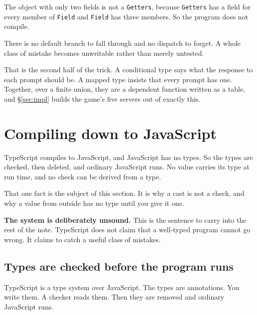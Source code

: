 \documentclass[11pt,a4paper]{article}
\begin{document}
\begin{pinkbox}
The object with only two fields is not a \texttt{Getters}, because \texttt{Getters} has a field for
every member of \texttt{Field} and \texttt{Field} has three members. So the program does not
compile.

There is no default branch to fall through and no dispatch to forget. A whole class of mistake
becomes unwritable rather than merely untested.

That is the second half of the trick. A conditional type says what the response to each prompt should
be. A mapped type insists that every prompt has one. Together, over a finite union, they are a
dependent function written as a table, and §\ref{sec:impl} builds the game's five servers out of
exactly this.
\end{pinkbox}

\newpage

\section{Compiling down to JavaScript}
\label{sec:unusual}

TypeScript compiles to JavaScript, and JavaScript has no types. So the types are checked, then
deleted, and ordinary JavaScript runs. No value carries its type at run time, and no check can be
derived from a type.

That one fact is the subject of this section. It is why a cast is not a check, and why a value
from outside has no type until you give it one.

\begin{center}
\colorbox{hdrbg}{\begin{minipage}{0.94\linewidth}\vspace{1.5mm}
\textbf{The system is deliberately unsound.} This is the sentence to carry into the rest of the
note. TypeScript does not claim that a well-typed program cannot go wrong. It claims to catch a
useful class of mistakes.
\vspace{1.5mm}\end{minipage}}
\end{center}

\subsection{Types are checked before the program runs}

TypeScript is a type system over JavaScript. The types are annotations. You write them. A checker
reads them. Then they are removed and ordinary JavaScript runs.
\end{document}
